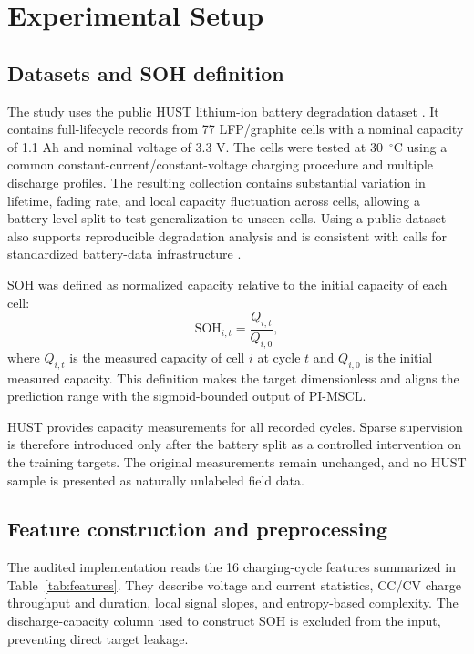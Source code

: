 \documentclass[a4paper,fleqn]{cas-dc}
\begin{document}
\section{Experimental Setup}
\label{sec:experiments}

\subsection{Datasets and SOH definition}
\label{subsec:datasets}

The study uses the public HUST lithium-ion battery degradation dataset \cite{Yuan2022HUSTDataset}. It contains full-lifecycle records from 77 LFP/graphite cells with a nominal capacity of 1.1 Ah and nominal voltage of 3.3 V. The cells were tested at 30~$^{\circ}$C using a common constant-current/constant-voltage charging procedure and multiple discharge profiles. The resulting collection contains substantial variation in lifetime, fading rate, and local capacity fluctuation across cells, allowing a battery-level split to test generalization to unseen cells. Using a public dataset also supports reproducible degradation analysis and is consistent with calls for standardized battery-data infrastructure \cite{ward2022principles}.

SOH was defined as normalized capacity relative to the initial capacity of each cell:
\begin{equation}
\mathrm{SOH}_{i,t}=\frac{Q_{i,t}}{Q_{i,0}},
\label{eq:soh_definition}
\end{equation}
where $Q_{i,t}$ is the measured capacity of cell $i$ at cycle $t$ and $Q_{i,0}$ is the initial measured capacity. This definition makes the target dimensionless and aligns the prediction range with the sigmoid-bounded output of PI-MSCL.

HUST provides capacity measurements for all recorded cycles. Sparse supervision is therefore introduced only after the battery split as a controlled intervention on the training targets. The original measurements remain unchanged, and no HUST sample is presented as naturally unlabeled field data.

\subsection{Feature construction and preprocessing}
\label{subsec:features_preprocessing}

The audited implementation reads the 16 charging-cycle features summarized in Table~\ref{tab:features}. They describe voltage and current statistics, CC/CV charge throughput and duration, local signal slopes, and entropy-based complexity. The discharge-capacity column used to construct SOH is excluded from the input, preventing direct target leakage.
\end{document}
